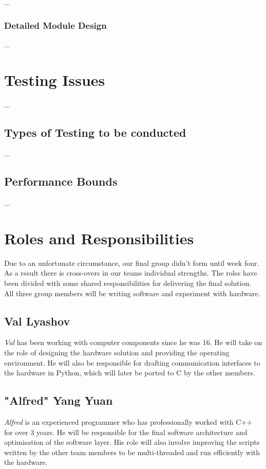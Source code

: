 \documentclass[11pt,a4paper,titlepage]{report}
\begin{document}
...

\subsubsection{Detailed Module Design}

...


\section{Testing Issues}

...

\subsection{Types of Testing to be conducted}

...

\subsection{Performance Bounds}

...




\section{Roles and Responsibilities}

Due to an unfortunate circumstance, our final group didn't form until week four. As a result there is cross-overs in our teams individual strengths. The roles have been divided with some shared responsibilities for delivering the final solution. All three group members will be writing software and experiment with hardware.


\subsection{Val Lyashov}
\textit{Val} has been working with computer components since he was 16. He will take on the role of designing the hardware solution and providing the operating environment. He will also be responsible for drafting communication interfaces to the hardware in Python, which will later be ported to C by the other members.


\subsection{"Alfred" Yang Yuan}
\textit{Alfred} is an experienced programmer who has professionally worked with C++ for over 3 years. He will be responsible for the final software architecture and optimisation of the software layer. His role will also involve improving the scripts written by the other team members to be multi-threaded and run efficiently with the hardware.
\end{document}

